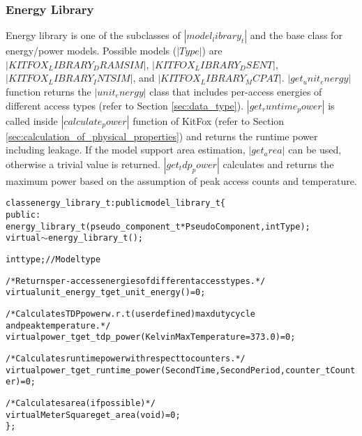 \subsubsection{Energy Library}
\noindent
Energy library is one of the subclasses of $|model_library_t|$ and the base class for energy/power models. 
Possible models ($|Type|$) are $|KITFOX_LIBRARY_DRAMSIM|$, $|KITFOX_LIBRARY_DSENT|$, $|KITFOX_LIBRARY_INTSIM|$, and $|KITFOX_LIBRARY_MCPAT|$. 
$|get_unit_energy|$ function returns the $|unit_energy|$ class that includes per-access energies of different access types (refer to Section \ref{sec:data_type}). 
$|get_runtime_power|$ is called inside $|calculate_power|$ function of KitFox (refer to Section \ref{sec:calculation_of_physical_properties}) and returns the runtime power including leakage. 
If the model support area estimation, $|get_area|$ can be used, otherwise a trivial value is returned. 
$|get_tdp_power|$ calculates and returns the maximum power based on the assumption of peak access counts and temperature.
{
\fontsize{10pt}{11pt}\selectfont
\begin{alltt}
class energy_library_t : public model_library_t \{
public:
    energy_library_t(pseudo_component_t *PseudoComponent, int Type);
    virtual \(\sim\)energy_library_t();

    int type; // Model type
    
    /* Returns per-access energies of different access types. */
    virtual unit_energy_t get_unit_energy() = 0;
    
    /* Calculates TDP power w.r.t (user defined) max duty cycle 
    and peak temperature. */
    virtual power_t get_tdp_power(Kelvin MaxTemperature = 373.0) = 0;
    
    /* Calculates runtime power with respect to counters. */
    virtual power_t get_runtime_power(Second Time, Second Period, counter_t Counter) = 0;
    
    /* Calculates area (if possible) */
    virtual MeterSquare get_area(void) = 0;
\};
\end{alltt}
}

